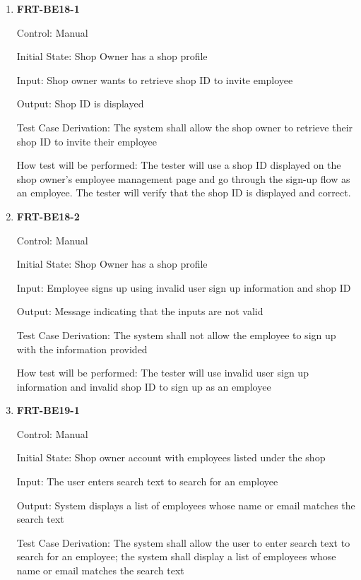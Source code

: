 \documentclass[12pt, titlepage]{article}
\begin{document}
\begin{enumerate}

	\item \textbf{FRT-BE18-1}

	      Control: Manual

	      Initial State: Shop Owner has a shop profile

	      Input: Shop owner wants to retrieve shop ID to invite employee

	      Output: Shop ID is displayed

	      Test Case Derivation: The system shall allow the shop owner to retrieve their shop ID to invite
	      their employee

	      How test will be performed: The tester will use a shop ID displayed on the shop owner's employee
	      management page and go through the sign-up flow as an employee. The tester will verify that the
	      shop ID is displayed and correct.

	\item \textbf{FRT-BE18-2}

	      Control: Manual

	      Initial State: Shop Owner has a shop profile

	      Input: Employee signs up using invalid user sign up information and shop ID

	      Output: Message indicating that the inputs are not valid

	      Test Case Derivation: The system shall not allow the employee to sign up with the information
	      provided

	      How test will be performed: The tester will use invalid user sign up information and invalid shop
	      ID to sign up as an employee

	\item \textbf{FRT-BE19-1}

	      Control: Manual

	      Initial State: Shop owner account with employees listed under the shop

	      Input: The user enters search text to search for an employee

	      Output: System displays a list of employees whose name or email matches the search text

	      Test Case Derivation: The system shall allow the user to enter search text to search for an
	      employee; the system shall display a list of employees whose name or email matches the search text


\end{enumerate}
\end{document}
